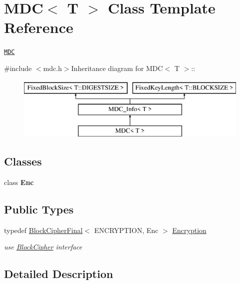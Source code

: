\hypertarget{class_m_d_c}{
\section{MDC$<$ T $>$ Class Template Reference}
\label{class_m_d_c}
}


\href{http://www.weidai.com/scan-mirror/cs.html#MDC}{\tt MDC}  


{\ttfamily \#include $<$mdc.h$>$}Inheritance diagram for MDC$<$ T $>$::\begin{figure}[H]
\begin{center}
\leavevmode
\includegraphics[height=3cm]{class_m_d_c}
\end{center}
\end{figure}
\subsection*{Classes}
\begin{DoxyCompactItemize}
\item 
class {\bfseries Enc}
\end{DoxyCompactItemize}
\subsection*{Public Types}
\begin{DoxyCompactItemize}
\item 
\hypertarget{class_m_d_c_a926e1a361c55ba954c031656cb2e9b4a}{
typedef \hyperlink{class_block_cipher_final}{BlockCipherFinal}$<$ ENCRYPTION, Enc $>$ \hyperlink{class_m_d_c_a926e1a361c55ba954c031656cb2e9b4a}{Encryption}}
\label{class_m_d_c_a926e1a361c55ba954c031656cb2e9b4a}

\begin{DoxyCompactList}\small\item\em use \hyperlink{class_block_cipher}{BlockCipher} interface \item\end{DoxyCompactList}\end{DoxyCompactItemize}


\subsection{Detailed Description}

